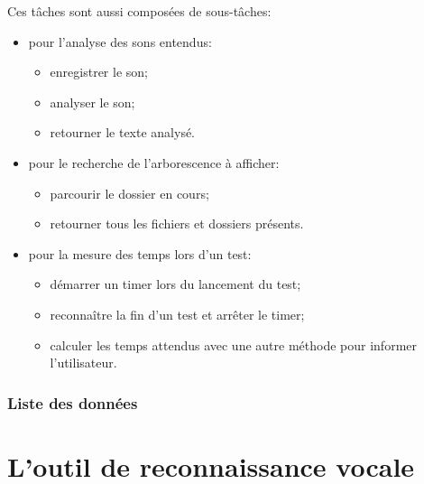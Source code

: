 \documentclass[a4paper, 11pt]{report}
\begin{document}
			Ces tâches sont aussi composées de sous-tâches:
			\begin{itemize}
				\item pour l'analyse des sons entendus:
				\begin{itemize}
					\item enregistrer le son;
					\item analyser le son;
					\item retourner le texte analysé.
				\end{itemize}
				\item pour le recherche de l'arborescence à afficher:
				\begin{itemize}
					\item parcourir le dossier en cours;
					\item retourner tous les fichiers et dossiers présents.
				\end{itemize}
				\item pour la mesure des temps lors d'un test:
				\begin{itemize}
					\item démarrer un timer lors du lancement du test;
					\item reconnaître la fin d'un test et arrêter le timer;
					\item calculer les temps attendus avec une autre méthode pour informer l'utilisateur.
				\end{itemize}
			\end{itemize}
			
			\subsection{Liste des données}
			
			
	
	\chapter{L'outil de reconnaissance vocale}
	
\end{document}
